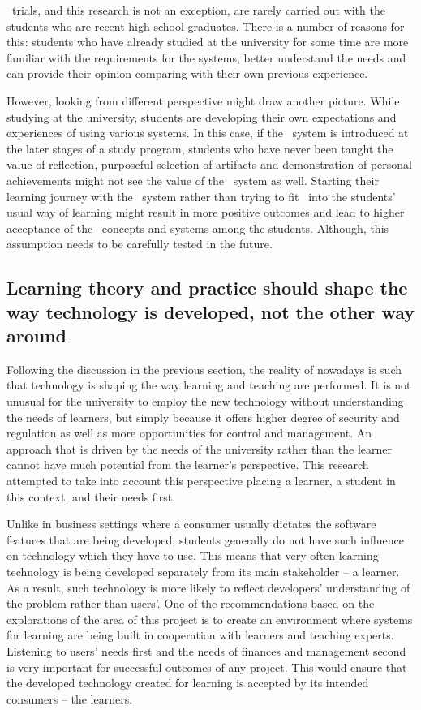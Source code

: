 \ep~trials, and this research is not an exception, are rarely carried out with
the students who are recent high school graduates. There is a number of reasons
for this: students who have already studied at the university for some time are
more familiar with the requirements for the systems, better understand the needs
and can provide their opinion comparing with their own previous experience.

However, looking from different perspective might draw another picture. While
studying at the university, students are developing their own expectations and
experiences of using various systems. In this case, if the \ep~system is
introduced at the later stages of a study program, students who have never been
taught the value of reflection, purposeful selection of artifacts and
demonstration of personal achievements might not see the value of the \ep~system
as well. Starting their learning journey with the \ep~system rather than trying
to fit \ep~into the students' usual way of learning might result in more
positive outcomes and lead to higher acceptance of the \ep~concepts and systems
among the students. Although, this assumption needs to be carefully tested in
the future.

\subsection[Shaping Technology for Learning Needs]{Learning theory and practice
should shape the way technology is developed, not the other way around}

Following the discussion in the previous section, the reality of nowadays is
such that technology is shaping the way learning and teaching are performed. It
is not unusual for the university to employ the new technology without
understanding the needs of learners, but simply because it offers higher degree
of security and regulation as well as more opportunities for control and
management. An approach that is driven by the needs of the university rather
than the learner cannot have much potential from the learner's perspective. This
research attempted to take into account this perspective placing a learner, a
student in this context, and their needs first.

Unlike in business settings where a consumer usually dictates the software
features that are being developed, students generally do not have such influence
on technology which they have to use. This means that very often learning
technology is being developed separately from its main stakeholder -- a learner.
As a result, such technology is more likely to reflect developers' understanding
of the problem rather than users'. One of the recommendations based on the
explorations of the area of this project is to create an environment where
systems for learning are being built in cooperation with learners and teaching
experts. Listening to users' needs first and the needs of finances and
management second is very important for successful outcomes of any project. This
would ensure that the developed technology created for learning is accepted  by
its intended consumers -- the learners.

